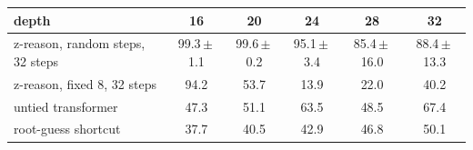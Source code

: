 \begin{tabular}{lccccc}
\toprule
depth & 16 & 20 & 24 & 28 & 32 \\
\midrule
z-reason, random steps, 32 steps & 99.3\,$\pm$\,1.1 & 99.6\,$\pm$\,0.2 & 95.1\,$\pm$\,3.4 & 85.4\,$\pm$\,16.0 & 88.4\,$\pm$\,13.3 \\
z-reason, fixed 8, 32 steps & 94.2 & 53.7 & 13.9 & 22.0 & 40.2 \\
untied transformer & 47.3 & 51.1 & 63.5 & 48.5 & 67.4 \\
\midrule
root-guess shortcut & 37.7 & 40.5 & 42.9 & 46.8 & 50.1 \\
\bottomrule
\end{tabular}
